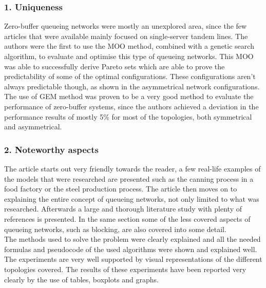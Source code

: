 \documentclass[twoside]{article}
\begin{document}
\begin{multicols}{2} %
\subsubsection*{1. Uniqueness}
Zero-buffer queueing networks were mostly an unexplored area, since the few articles that were available mainly focused on single-server tandem lines. The authors were the first to use the MOO method, combined with a genetic search algorithm, to evaluate and optimise this type of queueing networks. This MOO was able to successfully derive Pareto sets which are able to prove the predictability of some of the optimal configurations. These configurations aren't always predictable though, as shown in the asymmetrical network configurations.\\
The use of GEM method was proven to be a very good method to evaluate the performance of zero-buffer systems, since the authors achieved a deviation in the performance results of mostly 5\% for most of the topologies, both symmetrical and asymmetrical.\\
\subsubsection*{2. Noteworthy aspects}
The article starts out very friendly towards the reader, a few real-life examples of the models that were researched are presented such as the canning process in a food factory or the steel production process. The article then moves on to explaining the entire concept of queueing networks, not only limited to what was researched. Afterwards a large and thorough literature study with plenty of references is presented. In the same section some of the less covered aspects of queueing networks, such as blocking, are also covered into some detail.\\
The methods used to solve the problem were clearly explained and all the needed formulas and pseudocode of the used algorithms were shown and explained well.\\
The experiments are very well supported by visual representations of the different topologies covered. The results of these experiments have been reported very clearly by the use of tables, boxplots and graphs.\\

\end{multicols}
\end{document}

